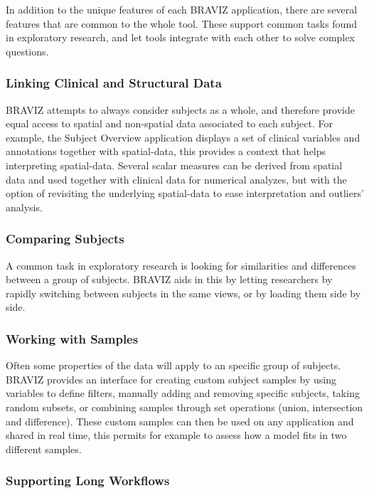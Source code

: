 \documentclass[twocolumn]{svjour3} %
\begin{document}
In addition to the unique features of each BRAVIZ application, there are several features that are common to the whole tool. These support common tasks found in exploratory research, and let tools integrate with each other to solve complex questions.

\subsubsection{Linking Clinical and Structural Data}

BRAVIZ attempts to always consider subjects as a whole, and therefore provide equal access to spatial and non-spatial data associated to each subject. For example, the Subject Overview application displays a set of clinical variables and annotations together with spatial-data, this provides a context that helps interpreting spatial-data. Several scalar measures can be derived from spatial data and used together with clinical data for numerical analyzes, but with the option of revisiting the underlying spatial-data to ease interpretation and outliers' analysis.

\subsubsection{Comparing Subjects}

A common task in exploratory research is looking for similarities and differences between a group of subjects. BRAVIZ aids in this by letting researchers by rapidly switching between subjects in the same views, or by loading them side by side.

\subsubsection{Working with Samples}

Often some properties of the data will apply to an specific group of subjects. BRAVIZ provides an interface for creating custom subject samples by using variables to define filters, manually adding and removing specific subjects, taking random subsets, or combining samples through set operations (union, intersection and difference).  These custom samples can then be used on any application and shared in real time, this permits for example to assess how a model fits in two different samples.

\subsubsection{Supporting Long Workflows}
\end{document}
